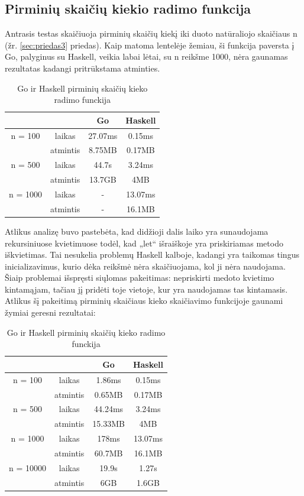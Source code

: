 \documentclass{VUMIFPSbakalaurinis}
\begin{document}
	\subsection{Pirminių skaičių kiekio radimo funkcija}
	 Antrasis testas skaičiuoja pirminių skaičių kiekį iki duoto natūraliojo skaičiaus n (žr. \ref{sec:priedas3} priedas). Kaip matoma lentelėje žemiau, ši funkcija paversta į Go, palyginus su Haskell, veikia labai lėtai, su n reikšme 1000, nėra gaunamas rezultatas kadangi pritrūkstama atminties.
	\begin{center}
		\centering
		\begin{table}[H]
			\caption{Go ir Haskell pirminių skaičių kieko radimo funckija}
			\centering
		\begin{tabular}{ cccc } 
		& & \textbf{Go} & \textbf{Haskell}  \\
		\midrule
		n = 100 & laikas & 27.07ms & 0.15ms    \\
		& atmintis & 8.75MB & 0.17MB \\
		\midrule
		n = 500 & laikas & 44.7s & 3.24ms  \\
		& atmintis & 13.7GB & 4MB \\
		\midrule
		n = 1000 & laikas & - & 13.07ms  \\
		& atmintis & - & 16.1MB \\
		\end{tabular}
		\centering
	\end{table}
		\end{center}
		Atlikus analizę buvo pastebėta, kad didžioji dalis laiko yra sunaudojama rekursiniuose kvietimuose todėl, kad „let“ išraiškoje yra priskiriamas metodo iškvietimas. Tai nesukelia problemų Haskell kalboje, kadangi  yra taikomas tingus inicializavimus, kurio dėka reikšmė nėra skaičiuojama, kol ji nėra naudojama. Šiaip problemai išspręsti siųlomas pakeitimas: nepriskirti medoto kvietimo kintamąjam, tačiau jį pridėti toje vietoje, kur yra naudojamas tas kintamasis. Atlikus šį pakeitimą pirminių skaičiaus kieko skaičiavimo funkcijoje gaunami žymiai geresni rezultatai:
		\begin{center}
			\centering
			\begin{table}[H]
				\caption{Go ir Haskell pirminių skaičių kieko radimo funckija}
				\centering
			\begin{tabular}{ cccc } 
			& & \textbf{Go} & \textbf{Haskell}  \\
			\midrule
			n = 100 & laikas & 1.86ms & 0.15ms    \\
			& atmintis & 0.65MB & 0.17MB \\
			\midrule
			n = 500 & laikas & 44.24ms & 3.24ms  \\
			& atmintis & 15.33MB & 4MB \\
			\midrule
			n = 1000 & laikas & 178ms & 13.07ms  \\
			& atmintis & 60.7MB & 16.1MB \\
			\midrule
			n = 10000 & laikas & 19.9s & 1.27s  \\
			& atmintis & 6GB & 1.6GB \\
			\end{tabular}
			\centering
		\end{table}
			\end{center}
\end{document}
